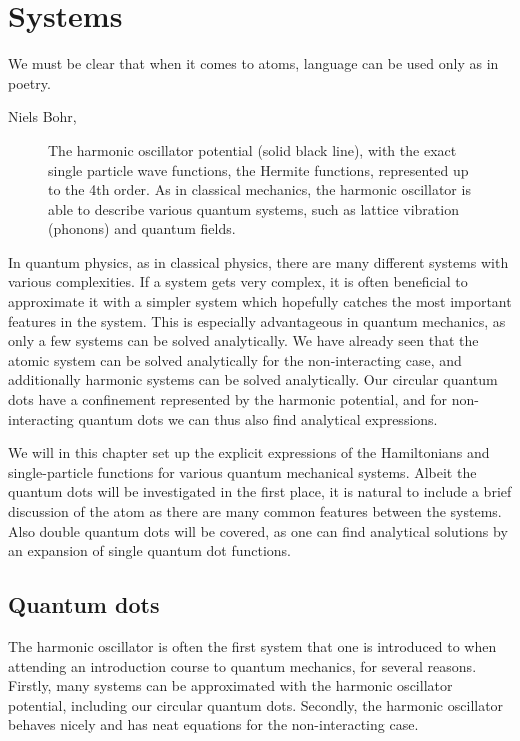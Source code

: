 \chapter{Systems} \label{chp:systems}
\epigraph{We must be clear that when it comes to atoms, language can be used only as in poetry.}{Niels Bohr, \cite{heisenberg_physics_1971}}
\begin{figure}[H]
	\centering
	
	\caption{The harmonic oscillator potential (solid black line), with the exact single particle wave functions, the Hermite functions, represented up to the 4th order. As in classical mechanics, the harmonic oscillator is able to describe various quantum systems, such as lattice vibration (phonons) and quantum fields.}
	\label{fig:harmonicoscillator}
\end{figure}

In quantum physics, as in classical physics, there are many different systems with various complexities. If a system gets very complex, it is often beneficial to approximate it with a simpler system which hopefully catches the most important features in the system. This is especially advantageous in quantum mechanics, as only a few systems can be solved analytically. We have already seen that the atomic system can be solved analytically for the non-interacting case, and additionally harmonic systems can be solved analytically. Our circular quantum dots have a confinement represented by the harmonic potential, and for non-interacting quantum dots we can thus also find analytical expressions. 

We will in this chapter set up the explicit expressions of the Hamiltonians and single-particle functions for various quantum mechanical systems. Albeit the quantum dots will be investigated in the first place, it is natural to include a brief discussion of the atom as there are many common features between the systems. Also double quantum dots will be covered, as one can find analytical solutions by an expansion of single quantum dot functions.

\section{Quantum dots} \label{sec:quantumdots}
The harmonic oscillator is often the first system that one is introduced to when attending an introduction course to quantum mechanics, for several reasons. Firstly, many systems can be approximated with the harmonic oscillator potential, including our circular quantum dots. Secondly, the harmonic oscillator behaves nicely and has neat equations for the non-interacting case. 

